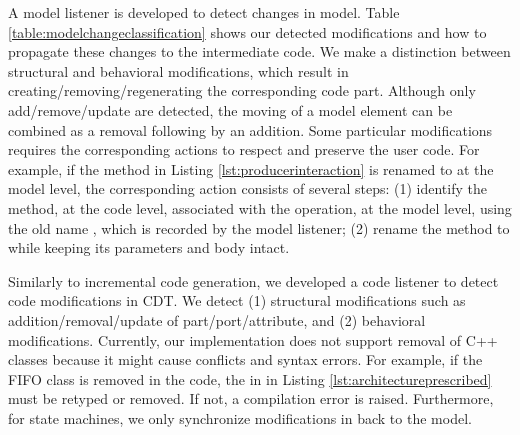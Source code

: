 \vskip 0.2cm
\noindent
{}
A model listener is developed to detect changes in model.
Table \ref{table:modelchangeclassification} shows our detected modifications and how to propagate these changes to the intermediate code.
We make a distinction between structural and behavioral modifications, which result in creating/removing/regenerating the corresponding code part.
Although only add/remove/update are detected, the moving of a model element can be combined as a removal following by an addition.  
Some particular modifications requires the corresponding actions to respect and preserve the user code.
For example, if the  method in Listing \ref{lst:producerinteraction} is renamed to  at the model level, the corresponding action consists of several steps: (1) identify the method, at the code level, associated with the operation, at the model level, using the old name , which is recorded by the model listener;
(2) rename the method to  while keeping its parameters and body intact. 

\vskip 0.2cm
\noindent
{}
Similarly to incremental code generation, we developed a code listener to detect code modifications in CDT.
We detect (1) structural modifications such as addition/removal/update of part/port/attribute, and (2) behavioral modifications.
Currently, our implementation does not support removal of C++ classes because it might cause conflicts and syntax errors.  
For example, if the FIFO class is removed in the code, the  in  in Listing \ref{lst:architectureprescribed} must be retyped or removed.
If not, a compilation error is raised.
Furthermore, for state machines, we only synchronize modifications in  back to the model.  



